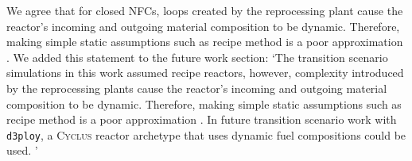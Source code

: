 \documentclass[answers,11pt]{exam}
\newcommand{\Cyclus}{\textsc{Cyclus}\xspace}%
\newcommand{\deploy}{\texttt{d3ploy}\xspace}%
\begin{document}
\begin{questions}
\begin{solution}
We agree that for closed NFCs, loops created by the reprocessing plant cause the reactor's 
incoming and outgoing material composition to be dynamic. Therefore, making simple static 
assumptions such as recipe method is a poor approximation 
\cite{bae_neural_2019,peterson-droogh_value_2018}. 
We added this statement to the future work section: 
`The transition scenario simulations in this work assumed recipe reactors, 
however, complexity introduced by the reprocessing plants cause the reactor's 
incoming and outgoing material composition to be dynamic. Therefore, making simple static 
assumptions such as recipe method is a poor approximation 
\cite{bae_neural_2019,peterson-droogh_value_2018}. 
In future transition scenario work with \deploy, a \Cyclus 
reactor archetype that uses dynamic fuel compositions could be used. '

\end{solution}

\question 


\end{questions}
\end{document}
